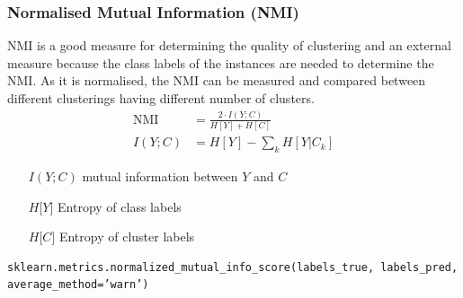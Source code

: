 \documentclass[11pt]{article}
\theoremstyle{definition}
\begin{document}
\subsubsection{Normalised Mutual Information (NMI)}
NMI is a good measure for determining the quality of clustering and an external measure because the class labels of the instances are needed to determine the NMI. As it is normalised, the NMI can be measured and compared between different clusterings having different number of clusters.
\begin{align*}
	\text{NMI} &= \frac{2\cdot I(Y;C)}{H[Y] + H[C]}\\
	I(Y;C) &= H[Y] - \sum_k H[Y|C_k]
\end{align*}
\begin{itemize}[nosep, leftmargin=*, labelindent=5cm, labelsep=0.5cm]
	\item[$I(Y;C)$] mutual information between $Y$ and $C$
	\item[$H\lbrack Y \rbrack$] Entropy of class labels
	\item[$H\lbrack C \rbrack$] Entropy of cluster labels
\end{itemize}
\begin{verbatim}
sklearn.metrics.normalized_mutual_info_score(labels_true, labels_pred, average_method=’warn’)
\end{verbatim}
\end{document}
